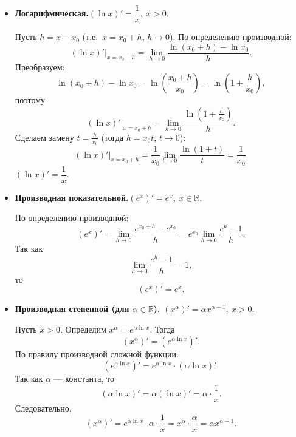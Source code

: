 \begin{Proof}
\begin{itemize}
\item \textbf{Логарифмическая.}\quad $(\ln x)'=\dfrac1x,\ x>0.$

Пусть $h=x-x_0$ (т.е.\ $x=x_0+h$, $h\to 0$). По определению производной:
\[
(\ln x)'\big|_{x=x_0 + h}
=\lim_{h\to 0}\frac{\ln(x_0+h)-\ln x_0}{h}.
\]
Преобразуем:
\[
\ln(x_0+h)-\ln x_0=\ln\!\left(\frac{x_0+h}{x_0}\right)=\ln\!\left(1+\frac{h}{x_0}\right),
\]
поэтому
\[
(\ln x)'\big|_{x=x_0 + h}
=\lim_{h\to 0}\frac{\ln\!\left(1+\frac{h}{x_0}\right)}{h}.
\]
Сделаем замену $t=\frac{h}{x_0}$ (тогда $h=x_0t$, $t\to 0$):
\[
(\ln x)'\big|_{x=x_0+h}
=\frac1{x_0}\lim_{t\to 0}\frac{\ln(1+t)}{t} = \frac1{x_0}\
\]
$(\ln x)'=\dfrac1{x}$.

\bigskip

\item \textbf{Производная показательной.}\quad $(e^x)'=e^x,\ x\in\mathbb{R}.$

По определению производной:
\[
(e^x)'=\lim_{h\to 0}\frac{e^{x_0+h}-e^{x_0}}{h}
=e^{x_0}\lim_{h\to 0}\frac{e^h-1}{h}.
\]
Так как
\[
\lim_{h\to 0}\frac{e^h-1}{h}=1,
\]
то
\[
(e^x)'=e^x.
\]
\end{itemize}

\begin{itemize}
\item \textbf{Производная степенной (для $\alpha\in\mathbb{R}$).}\quad
$(x^\alpha)'=\alpha x^{\alpha-1},\ x>0.$

Пусть $x>0$. Определим $x^\alpha=e^{\alpha\ln x}$. Тогда
\[
(x^\alpha)'=(e^{\alpha\ln x})'.
\]
По правилу производной сложной функции:
\[
(e^{\alpha\ln x})'=e^{\alpha\ln x}\cdot(\alpha\ln x)'.
\]
Так как $\alpha$ — константа, то
\[
(\alpha\ln x)'=\alpha(\ln x)'=\alpha\cdot\frac1x.
\]
Следовательно,
\[
(x^\alpha)'=e^{\alpha\ln x}\cdot\alpha\cdot\frac1x
=x^\alpha\cdot\frac{\alpha}{x}=\alpha x^{\alpha-1}.
\]

\bigskip

\end{itemize}
\end{Proof}

